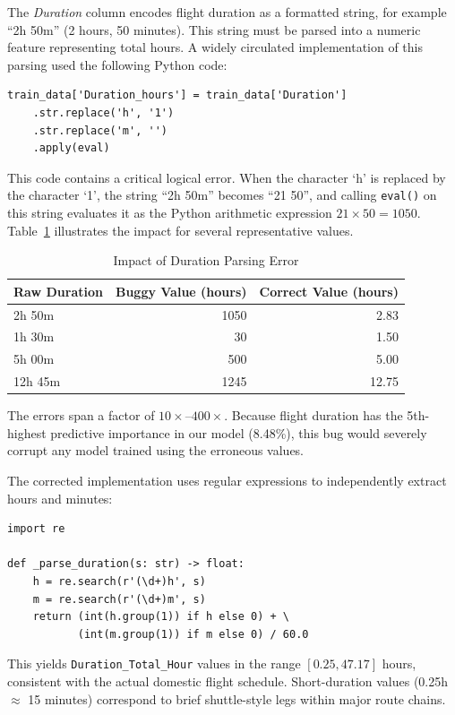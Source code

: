 \documentclass[12pt, a4paper]{article}
\begin{document}
The \textit{Duration} column encodes flight duration as a formatted string,
for example ``2h 50m'' (2 hours, 50 minutes).  This string must be parsed into
a numeric feature representing total hours.  A widely circulated implementation
of this parsing used the following Python code:

\begin{verbatim}
train_data['Duration_hours'] = train_data['Duration']
    .str.replace('h', '1')
    .str.replace('m', '')
    .apply(eval)
\end{verbatim}

This code contains a critical logical error.  When the character `h' is
replaced by the character `1', the string ``2h 50m'' becomes ``21 50'', and
calling \texttt{eval()} on this string evaluates it as the Python arithmetic
expression $21 \times 50 = 1050$.  Table~\ref{tab:bugfix} illustrates the
impact for several representative values.

\begin{table}[h]
\caption{Impact of Duration Parsing Error}
\label{tab:bugfix}
\centering
\begin{tabular}{lrr}
\toprule
\textbf{Raw Duration} & \textbf{Buggy Value (hours)} & \textbf{Correct Value (hours)} \\
\midrule
2h 50m  & 1050  & 2.83 \\
1h 30m  & 30    & 1.50 \\
5h 00m  & 500   & 5.00 \\
12h 45m & 1245  & 12.75 \\
\bottomrule
\end{tabular}
\end{table}

The errors span a factor of $10\times$--$400\times$.  Because flight duration
has the 5th-highest predictive importance in our model (8.48\%), this bug would
severely corrupt any model trained using the erroneous values.

The corrected implementation uses regular expressions to independently extract
hours and minutes:

\begin{verbatim}
import re

def _parse_duration(s: str) -> float:
    h = re.search(r'(\d+)h', s)
    m = re.search(r'(\d+)m', s)
    return (int(h.group(1)) if h else 0) + \
           (int(m.group(1)) if m else 0) / 60.0
\end{verbatim}

This yields \texttt{Duration\_Total\_Hour} values in the range $[0.25, 47.17]$
hours, consistent with the actual domestic flight schedule.  Short-duration
values (0.25h $\approx$ 15 minutes) correspond to brief shuttle-style legs
within major route chains.
\end{document}
